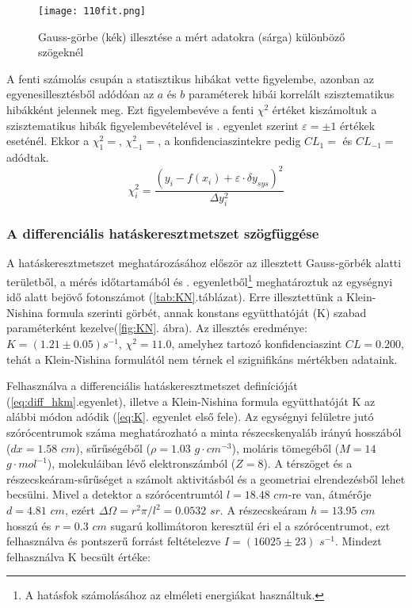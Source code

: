 \documentclass[a4paper,12pt]{article}
\begin{document}
\begin{figure}[!htb]
\centering
    \begin{minipage}{.49\textwidth}
        \centering
        \texttt{[image: 110fit.png]}
    \end{minipage}
    \caption{Gauss-görbe (kék) illesztése a mért adatokra (sárga) különböző szögeknél}
    \label{fig:gauss}
\end{figure}	



A fenti számolás csupán a statisztikus hibákat vette figyelembe, azonban az egyenesillesztésből adódóan az $a$ és $b$ paraméterek hibái korrelált szisztematikus hibákként jelennek meg. Ezt figyelembevéve a fenti $\chi^2$ értéket kiszámoltuk a szisztematikus hibák figyelembevételével is . egyenlet szerint $\varepsilon=\pm 1$ értékek eseténél. Ekkor a $\chi^2_1=$, $\chi^2_{-1}=$,  a konfidenciaszintekre pedig $CL_1 =$ és $CL_{-1}=$ adódtak.
\begin{equation}
	\chi^2_i=\frac{(y_i-f(x_i)+\varepsilon\cdot\delta y_{sys})^2}{\Delta y_i^2}
	\label{eq:syst}
\end{equation}

\subsubsection*{A differenciális hatáskeresztmetszet szögfüggése}
A hatáskeresztmetszet meghatározásához először az illesztett Gauss-görbék alatti területből, a mérés időtartamából és . egyenletből\footnote{A hatásfok számolásához az elméleti energiákat használtuk.} meghatároztuk az egységnyi idő alatt bejövő fotonszámot (\ref{tab:KN}.táblázat). Erre  illesztettünk a Klein-Nishina formula szerinti görbét, annak konstans együtthatóját (K) szabad paraméterként kezelve(\ref{fig:KN}. ábra). Az illesztés eredménye: $K=(1.21\pm0.05)s^{-1}$, $\chi^2=11.0$, amelyhez tartozó konfidenciaszint $CL=0.200$, tehát a Klein-Nishina formulától nem térnek el szignifikáns mértékben adataink.

Felhasználva a differenciális hatáskeresztmetszet definícióját (\ref{eq:diff_hkm}.egyenlet), illetve a Klein-Nishina formula együtthatóját K az alábbi módon adódik (\ref{eq:K}. egyenlet első fele). Az egységnyi felületre jutó szórócentrumok száma meghatározható a minta részecskenyaláb irányú hosszából ($dx=1.58$ $cm$), sűrűségéből ($\rho=1.03$ $g\cdot cm^{-3}$), moláris tömegéből ($M=14$ $g\cdot mol^{-1}$), molekuláiban lévő elektronszámból ($Z=8$). A térszöget és a részecskeáram-sűrűséget a számolt aktivitásból és a geometriai elrendezésből lehet becsülni. Mivel a detektor a szórócentrumtól $l=18.48$ $cm$-re van, átmérője $d=4.81$ $cm$, ezért $\Delta\Omega = r^2\pi/l^2=0.0532$ $sr$. A részecskeáram $h=13.95$ $cm$ hosszú és $r=0.3$ $cm$ sugarú kollimátoron keresztül éri el a szórócentrumot, ezt felhasználva és pontszerű forrást feltételezve $I=(16025\pm23)$ $s^{-1}$. Mindezt felhasználva K becsült értéke:
\end{document}
